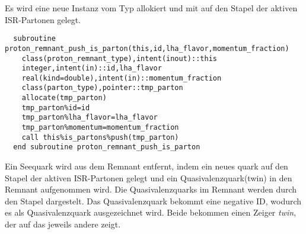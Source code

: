 Es wird eine neue Instanz vom Typ  allokiert und mit  auf den Stapel  der aktiven ISR-Partonen gelegt.
\begin{Verbatim}
  subroutine proton_remnant_push_is_parton(this,id,lha_flavor,momentum_fraction)
    class(proton_remnant_type),intent(inout)::this
    integer,intent(in)::id,lha_flavor
    real(kind=double),intent(in)::momentum_fraction
    class(parton_type),pointer::tmp_parton
    allocate(tmp_parton)
    tmp_parton%id=id
    tmp_parton%lha_flavor=lha_flavor
    tmp_parton%momentum=momentum_fraction
    call this%is_partons%push(tmp_parton)
  end subroutine proton_remnant_push_is_parton
\end{Verbatim}
Ein Seequark wird aus dem Remnant entfernt, indem ein neues quark auf den Stapel\linebreak {} der aktiven ISR-Partonen gelegt und ein Quasivalenzquark(twin) in den Remnant aufgenommen wird. Die Quasivalenzquarks im Remnant werden durch den Stapel  dargestelt. Das Quasivalenzquark bekommt eine negative ID, wodurch es als Quasivalenzquark ausgezeichnet wird. Beide bekommen einen Zeiger \emph{twin}, der auf das jeweils andere zeigt.


